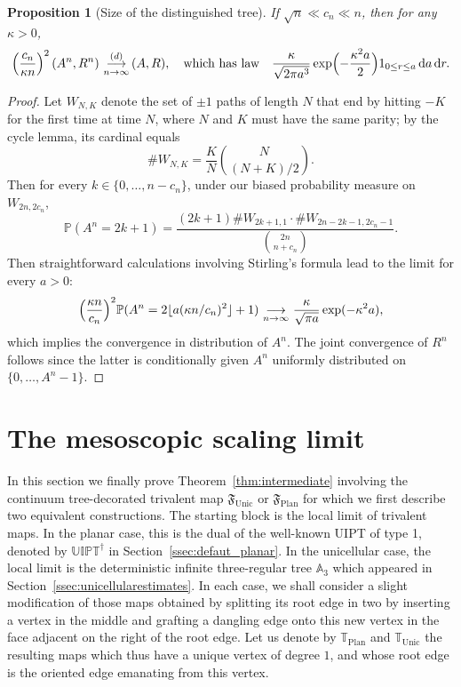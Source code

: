 \documentclass[10pt]{amsart}
\theoremstyle{plain}
\newtheorem{proposition}[theorem]{Proposition}
\theoremstyle{definition}
\theoremstyle{remark}
\renewcommand{\P}{\mathbb{P}}
\renewcommand{\d}{\mathop{}\!\mathrm{d}}
\newcommand{\cv}[1][n]{\,\mathop{\longrightarrow}^{}_{#1 \to \infty}\,}
\newcommand{\cvloi}[1][n]{\,\mathop{\longrightarrow}^{(d)}_{#1 \to \infty}\,}
\DeclarePairedDelimiter\floor{\lfloor}{\rfloor}
\begin{document}
\begin{proposition}[Size of the distinguished tree]\label{prop:volume_arbre_racine}
If $\sqrt{n} \ll c_n \ll n$, then for any $\kappa >0$,
\[
\left(\frac{c_n}{\kappa n}\right)^2 \left(A^n, R^n\right) \cvloi (A, R),
\quad\text{which has law}\quad
\frac{\kappa}{\sqrt{2 \pi a^3}} \exp\Bigl(- \frac{\kappa^2 a}{2}\Bigr) 1_{0 \le r \le a} \d a \d r.
\]
\end{proposition}

\begin{proof}
Let $W_{N,K}$ denote the set of $\pm1$ paths of length $N$ that end by hitting $-K$ for the first time at time $N$, where $N$ and $K$ must have the same parity; by the cycle lemma, its cardinal equals
\[
\#W_{N,K} = \frac{K}{N} \binom{N}{(N+K)/2}.
\]
Then for every $k \in \{0, \dots, n-c_{n}\}$, under our biased probability measure on $W_{2n, 2c_{n}}$,
\[
\P(A^n = 2k+1) = \frac{(2k+1) \#W_{2k+1,1} \cdot \#W_{2n-2k-1, 2c_{n}-1}}{\binom{2n}{n+c_{n}}}.
\]
Then straightforward calculations involving Stirling's formula lead to the limit for every $a>0$:
\[
\Bigl(\frac{\kappa n}{c_n}\Bigr)^2 \P(A^n = 2\floor{a (\kappa n/c_n)^2}+1)
\cv \frac{\kappa}{\sqrt{\pi a}} \exp(- \kappa^2 a),
\]
which implies the convergence in distribution of $A^n$.
The joint convergence of $R^n$ follows since the latter is conditionally given $A^n$ uniformly distributed on \hbox{$\{0, \dots, A^n\!-\!1\}$}.
\end{proof}

\section{The mesoscopic scaling limit}
\label{sec:mesoscopic}

In this section we finally prove Theorem~\ref{thm:intermediate} involving the continuum tree-decorated trivalent map $\mathfrak{F}_{ \mathrm{Unic}}$ or $\mathfrak{F}_{ \mathrm{Plan}}$ for which we first describe two equivalent constructions. The starting block is the local limit of trivalent maps.
In the planar case, this is the dual of the well-known UIPT of type 1, denoted by $\mathbb{UIPT}^\dagger$ in Section~\ref{ssec:defaut_planar}. In the unicellular case, the local limit is the deterministic infinite three-regular tree $\mathbb{A}_3$ which appeared in Section~\ref{ssec:unicellularestimates}.
In each case, we shall consider a slight modification of those maps obtained by splitting its root edge in two by inserting a vertex in the middle and grafting a dangling edge onto this new vertex in the face adjacent on the right of the root edge. Let us denote by $\mathbb{T}_ \mathrm{Plan}$ and $\mathbb{T}_{ \mathrm{Unic}}$ the resulting maps which thus have a unique vertex of degree $1$, and whose root edge is the oriented edge emanating from this vertex.
\end{document}
